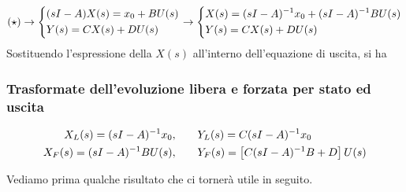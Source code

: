 \begin{equation*}
(\star) \rightarrow
\begin{dcases}
(sI-A)X(s) = x_0 + BU(s) \\
Y(s) = CX(s) + DU(s) 
\end{dcases} \rightarrow \begin{dcases}
X(s) = (sI-A)^{-1}x_0 + (sI-A)^{-1}BU(s) \\
Y(s) = CX(s) + DU(s) 
\end{dcases}
\end{equation*}
Sostituendo l'espressione della $X(s)$ all'interno dell'equazione di uscita, si ha
\begin{center}
\end{center}
\subsubsection{Trasformate dell'evoluzione libera e forzata per stato ed uscita}
\begin{align}
X_L(s) = (sI-A)^{-1}x_0, \quad & \quad Y_L(s) = C(sI-A)^{-1}x_0 \\
\label{eq:forz}
X_F(s) = (sI-A)^{-1} BU(s), \quad & \quad Y_F(s) = \left[ C(sI-A)^{-1}B + D \right]U(s)
\end{align}

Vediamo prima qualche risultato che ci tornerà utile in seguito.
